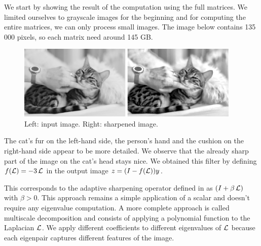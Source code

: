 We start by showing the result of the computation using the full matrices.
We limited ourselves to grayscale images for the beginning and for computing the entire matrices, we can only process small images.
The image below contains 135 000 pixels, so each matrix need around 145 GB.

\begin{figure}[H]
  \centering
  \includegraphics[width=0.95\textwidth]{img/cat.png}
  \caption{Left: input image. Right: sharpened image.}
\end{figure}

The cat's fur on the left-hand side, the person's hand and the cushion on the right-hand side appear to be more detailed.
We observe that the already sharp part of the image on the cat's head stays nice.
We obtained this filter by defining \(f(\operatorname{\mathcal{L}}) = -3\operatorname{\mathcal{L}}\) in the output image \(z = (I - f(\operatorname{\mathcal{L}}))y\).

This corresponds to the adaptive sharpening operator defined in \cite{siam_slides_2016} as \((I + \beta \operatorname{\mathcal{L}})\) with \(\beta > 0\).
This approach remains a simple application of a scalar and doesn't require any eigenvalue computation.
A more complete approach is called multiscale decomposition \cite{talebi_nonlocal_2014} and consists of applying a polynomial function to the Laplacian \(\operatorname{\mathcal{L}}\).
We apply different coefficients to different eigenvalues of \(\operatorname{\mathcal{L}}\) because each eigenpair captures different features of the image.
